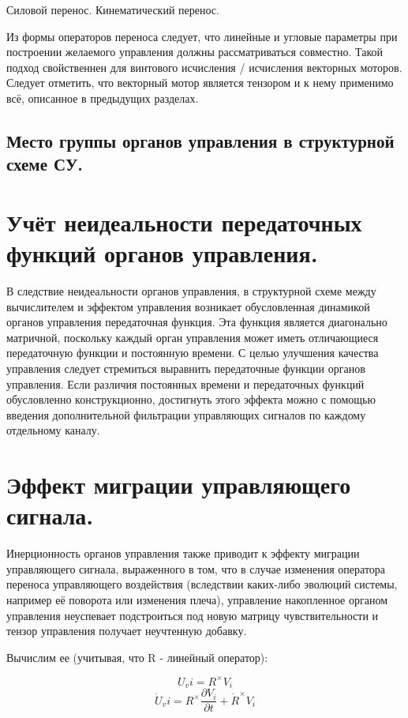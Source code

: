 \documentclass[a4paper]{article}
\begin{document}
Силовой перенос.
Кинематический перенос.

Из формы операторов переноса следует, что линейные и угловые параметры при построении желаемого управления должны рассматриваться совместно. Такой подход свойственнен для винтового исчисления / исчисления векторных моторов. Следует отметить, что векторный мотор является тензором и к нему применимо всё, описанное в предыдущих разделах.  

\subsection{Место группы органов управления в структурной схеме СУ.}

\section{Учёт неидеальности передаточных функций органов управления.}
В следствие неидеальности органов управления, в структурной схеме между вычислителем и эффектом управления возникает обусловленная динамикой органов управления передаточная функция. Эта функция является диагонально матричной, поскольку каждый орган управления может иметь отличающиеся передаточную функции и постоянную времени. С целью улучшения качества управления следует стремиться выравнить передаточные функции органов управления. Если различия постоянных времени и передаточных функций обусловленно конструкционно, достигнуть этого эффекта можно с помощью введения дополнительной фильтрации управляющих сигналов по каждому отдельному каналу.

\section{Эффект миграции управляющего сигнала.}
Инерционность органов управления также приводит к эффекту миграции управляющего сигнала, выраженного в том, что в случае изменения оператора переноса управляющего воздействия (вследствии каких-либо эволюций системы, например её поворота или изменения плеча), управление накопленное органом управления неуспевает подстроиться под новую матрицу чувствительности и тензор управления получает неучтенную добавку.

Вычислим ее (учитывая, что R - линейный оператор):

\begin{equation}U_vi = R^\times V_i\end{equation}
\begin{equation}\dot{U}_vi = R^\times \frac{\partial{V_i}}{\partial{t}} + \dot{R}^\times V_i\end{equation}
\end{document}
